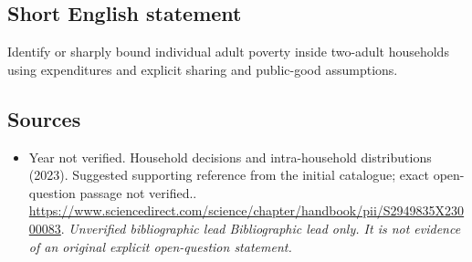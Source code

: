 \documentclass[11pt]{article}
\begin{document}
\subsection{Short English statement}
Identify or sharply bound individual adult poverty inside two-adult households using expenditures and explicit sharing and public-good assumptions.

\subsection{Sources}
\begin{itemize}\raggedright
\item[\textnormal{[S1]}]\hypertarget{source:30007740:1}{} Year not verified. Household decisions and intra-household distributions (2023). Suggested supporting reference from the initial catalogue; exact open-question passage not verified..
\url{https://www.sciencedirect.com/science/chapter/handbook/pii/S2949835X23000083}.
{\small\textit{Unverified bibliographic lead Bibliographic lead only. It is not evidence of an original explicit open-question statement.}}
\end{itemize}
\end{document}
